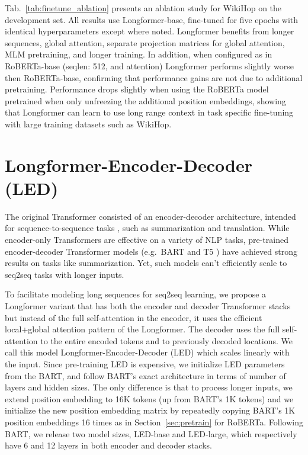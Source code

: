 \documentclass[11pt,a4paper]{article}
\newcommand{\model}{Longformer\xspace}
\begin{document}
Tab.~\ref{tab:finetune_ablation} presents an ablation study for WikiHop on the development set. All results use \model-base, fine-tuned for five epochs with identical hyperparameters except where noted.  \model benefits from longer sequences, global attention, separate projection matrices for global attention, MLM pretraining, and longer training.  In addition, when configured as in RoBERTa-base (seqlen: 512, and  attention) \model performs slightly worse then RoBERTa-base, confirming that performance gains are not due to additional pretraining.  Performance drops slightly when using the RoBERTa model pretrained when only unfreezing the additional position embeddings, showing that \model can learn to use long range context in task specific fine-tuning with large training datasets such as WikiHop.





%
 \section{Longformer-Encoder-Decoder (LED)}
\label{sec:led}

The original Transformer \cite{Vaswani2017AttentionIA} consisted of an encoder-decoder architecture, intended for
sequence-to-sequence tasks \cite{Sutskever2014SequenceTS}, such as summarization and translation. 
While encoder-only Transformers are effective on a variety of NLP tasks, pre-trained encoder-decoder Transformer models
(e.g.\ BART \cite{lewis-etal-2020-bart} and T5 \cite{Raffel2020ExploringTL})
have achieved strong results on tasks like summarization. Yet, such models can't efficiently scale to seq2seq tasks with longer inputs.




To facilitate modeling long sequences for seq2seq learning, we propose a Longformer variant that has both the encoder and decoder Transformer stacks but instead of the full self-attention in the encoder, it uses the efficient local+global attention pattern of the Longformer.  The decoder uses the full self-attention to the entire encoded tokens and to previously decoded locations. We call this model Longformer-Encoder-Decoder (LED) which scales linearly with the input.
Since pre-training LED is expensive, we initialize LED parameters from the BART, and follow BART's exact architecture in terms of number of layers and hidden sizes. The only difference is that to process longer inputs, we extend position embedding to 16K tokens (up from BART's 1K tokens) and we initialize the new position embedding matrix by repeatedly copying BART's 1K position embeddings 16 times as in Section~\ref{sec:pretrain} for RoBERTa. Following BART, we release two model sizes, LED-base and LED-large, which respectively have 6 and 12 layers in both encoder and decoder stacks.
\end{document}
